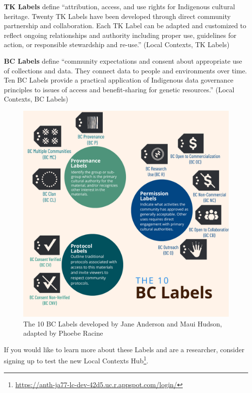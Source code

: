 \documentclass[
  11pt,
  paperpaper,
  openany]{book}
\DeclareRobustCommand{\href}[2]{#2\footnote{\url{#1}}}
\begin{document}
\textbf{TK Labels} define ``attribution, access, and use rights for Indigenous cultural heritage. Twenty TK Labels have been developed through direct community partnership and collaboration. Each TK Label can be adapted and customized to reflect ongoing relationships and authority including proper use, guidelines for action, or responsible stewardship and re-use.'' (Local Contexts, TK Labels)

\textbf{BC Labels} define ``community expectations and consent about appropriate use of collections and data. They connect data to people and environments over time. Ten BC Labels provide a practical application of Indigenous data governance principles to issues of access and benefit-sharing for genetic resources.'' (Local Contexts, BC Labels)

\begin{figure}
\includegraphics[width=1\linewidth]{images/bclabel_v3} \caption{The 10 BC Labels developed by Jane Anderson and Maui Hudson, adapted by Phoebe Racine}\label{fig:unnamed-chunk-5}
\end{figure}

If you would like to learn more about these Labels and are a researcher, consider signing up to test the new \href{https://anth-ja77-lc-dev-42d5.uc.r.appspot.com/login/}{Local Contexts Hub}.
\end{document}
